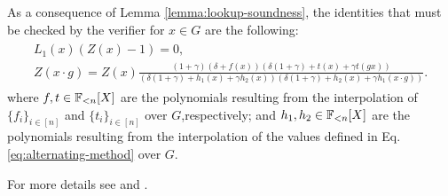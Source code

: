As a consequence of Lemma \ref{lemma:lookup-soundness}, the identities that must be checked by the verifier for $x \in G$ are the following: 
\begin{align} \label{eq:look-Z}
\begin{array}{c}
  L_1(x) \left( Z(x) - 1\right) = 0, \\[0.2cm]
  Z(x\cdot g) = \displaystyle Z(x)\frac{(1+\gamma)(\delta + f(x))(\delta(1+\gamma) + t(x) + \gamma t(gx))}{(\delta(1+\gamma) + {h_1}(x) + \gamma {h_2}(x))(\delta(1+\gamma) + {h_2}(x) + \gamma {h_1}(x\cdot g))}.
\end{array}
\end{align}
where $f,t \in \mathbb{F}_{<n}[X]$ are the polynomials resulting from the interpolation of $\{f_i\}_{i\in[n]}$ and $\{t_i\}_{i\in[n]}$ over $G$,respectively; and $h_1,h_2 \in \mathbb{F}_{<n}[X]$ are the polynomials resulting from the interpolation of the values defined in Eq. \eqref{eq:alternating-method} over $G$.

For more details see \cite{EPRINT:GabWil20} and \cite{EPRINT:PFMBM22}.
